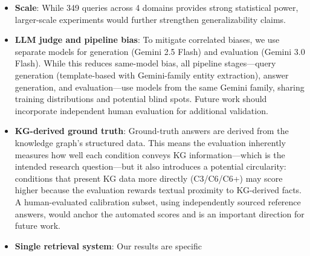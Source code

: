 \documentclass[runningheads]{llncs}
\begin{document}
\begin{itemize}
          \medskip

          This differs fundamentally from how production search engines
          operate. Google's crawler, for example, \emph{extracts} JSON-LD
          from \texttt{\textless script type="application/ld+json"\textgreater} blocks as a
          \emph{separate signal}, independent of the page's body text.
          The structured data is parsed into entity properties and indexed
          in a knowledge graph, not flattened into a single text
          embedding. A retrieval architecture that similarly extracts and
          separately indexes structured data---e.g., using multiple
          embedding fields or a hybrid entity--document store---might
          yield a significant H1 result. This remains an important area
          for future work.

    \item \textbf{Scale}: While 349 queries across 4 domains provides
          strong statistical power, larger-scale experiments would
          further strengthen generalizability claims.
    \item \textbf{LLM judge and pipeline bias}: To mitigate correlated biases, we use
          separate models for generation (Gemini 2.5 Flash) and
          evaluation (Gemini 3.0 Flash). While this reduces same-model
          bias, all pipeline stages---query generation (template-based
          with Gemini-family entity extraction), answer generation,
          and evaluation---use models from the same Gemini family,
          sharing training distributions and potential blind spots.
          Future work should incorporate independent
          human evaluation for additional validation.
    \item \textbf{KG-derived ground truth}: Ground-truth answers are
          derived from the knowledge graph's structured data.  This
          means the evaluation inherently measures how well each
          condition conveys KG information---which is the intended
          research question---but it also introduces a potential
          circularity: conditions that present KG data more directly
          (C3/C6/C6+) may score higher because the evaluation rewards
          textual proximity to KG-derived facts.  A human-evaluated
          calibration subset, using independently sourced reference
          answers, would anchor the automated scores and is an
          important direction for future work.
    \item \textbf{Single retrieval system}: Our results are specific

\end{itemize}
\end{document}
